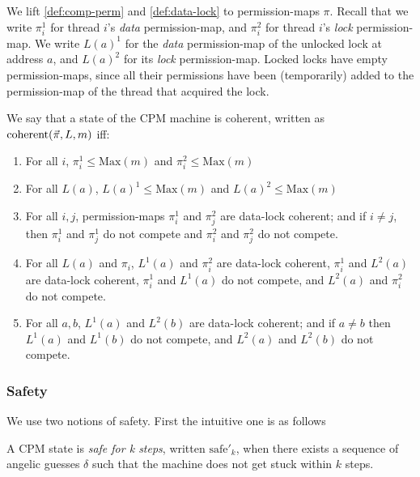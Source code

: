 We lift \cref{def:comp-perm} and \cref{def:data-lock} to permission-maps $\pi$.  Recall that we write $\pi^1_i$ for thread $i$'s \emph{data} permission-map, and $\pi^2_i$ for thread $i$'s \emph{lock} permission-map.  We write 
$L(a)^1$ for the \emph{data} permission-map of the unlocked lock at address $a$,
and $L(a)^2$ for its \emph{lock} permission-map.  Locked locks have empty permission-maps, since all their permissions have been (temporarily) added to the permission-map of the thread that acquired the lock.

\begin{definition}
  \label{def:dry-coherent}
  We say that a state of the $\mathrm{CPM}$ machine is $\mathrm{coherent}$,
  written as $\mathrm{coherent}(\vec{\pi},L,m)$ iff:
  \begin{enumerate}
  \item For all $i$, $\pi^1_i \leq \mathrm{Max}(m)$ and $\pi^2_i \leq
    \mathrm{Max}(m)$
  \item For all $L(a)$, $L(a)^1 \leq \mathrm{Max}(m)$ and $L(a)^2 \leq
    \mathrm{Max}(m)$
  \item For all $i,j$, permission-maps  $\pi_i^1$ and $\pi_j^2$ are data-lock
    coherent; and if $i\not= j$, then $\pi^1_i$ and $\pi^1_j$ do not compete
    and $\pi^2_i$ and $\pi^2_j$ do not compete.
  \item For all $L(a)$ and $\pi_i$, $L^1(a)$ and $\pi_i^2$ are data-lock
    coherent, $\pi^1_i$ and $L^2(a)$ are data-lock coherent, $\pi^1_i$ and
    $L^1(a)$ do not compete, and $L^2(a)$ and $\pi^2_i$ do not compete.
  \item For all $a,b$, $L^1(a)$ and $L^2(b)$ are data-lock coherent;
    and if $a \neq b$ then $L^1(a)$ and $L^1(b)$ do not compete, and $L^2(a)$
    and $L^2(b)$ do not compete.
  \end{enumerate}
\end{definition}

\subsubsection{Safety}

We use two notions of safety. First the intuitive one is as follows 
\begin{definition}
A CPM state is \emph{safe for k steps}, written 
$\mathrm{safe'}_{k}$, when
there exists a sequence of angelic guesses $\delta$
such that the machine does not get stuck within $k$ steps.
\end{definition}

